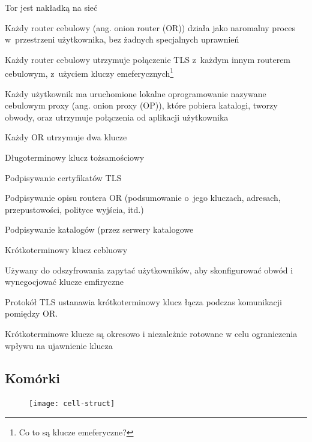 \begin{description}
  \begin{description}
   \item Tor jest nakładką na sieć
   \item Każdy router cebulowy (ang. onion router (OR)) działa jako naromalny proces w~przestrzeni użytkownika, bez żadnych specjalnych uprawnień
   \item Każdy router cebulowy utrzymuje połączenie TLS z~każdym innym routerem cebulowym, z~użyciem kluczy emeferycznych\footnote{Co to są klucze emeferyczne?}
   \item Każdy użytkownik ma uruchomione lokalne oprogramowanie nazywane cebulowym proxy (ang. onion proxy (OP)), które pobiera katalogi, tworzy obwody, oraz utrzymuje połączenia od aplikacji użytkownika
   \item Każdy OR utrzymuje dwa klucze
   \begin{description}
    \item Długoterminowy klucz tożsamościowy
    \begin{description}
     \item Podpisywanie certyfikatów TLS
     \item Podpisywanie opisu routera OR (podsumowanie o~jego kluczach, adresach, przepustowości, polityce wyjścia, itd.)
     \item Podpisywanie katalogów (przez serwery katalogowe
    \end{description}

    \item Krótkoterminowy klucz cebluowy
    \begin{description}
     \item Używany do odszyfrowania zapytać użytkowników, aby skonfigurować obwód i wynegocjować klucze emfiryczne
    \end{description}
    \item Protokół TLS ustanawia krótkoterminowy klucz łącza podczas komunikacji pomiędzy OR.
    \item Krótkoterminowe klucze są okresowo i niezależnie rotowane w celu ograniczenia wpływu na ujawnienie klucza

   \end{description}
   
  \end{description}

\end{description}


\subsection{Komórki}
   \begin{figure}
    \texttt{[image: cell-struct]}
    
   \end{figure}


